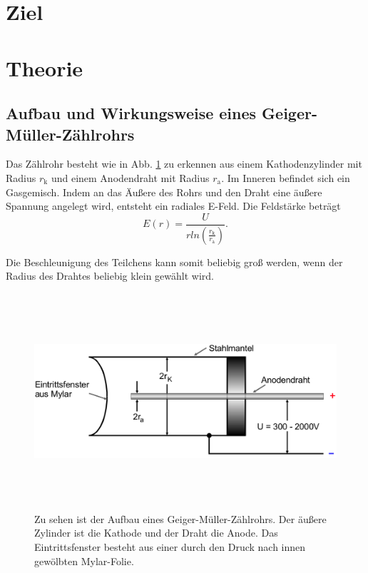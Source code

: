 \section{Ziel}

\section{Theorie}
\label{sec:Theorie}

\subsection{Aufbau und Wirkungsweise eines Geiger-Müller-Zählrohrs}

Das Zählrohr besteht wie in Abb. \ref{fig:zaehlrohr} zu erkennen aus einem Kathodenzylinder mit Radius $r_\text{k}$ und einem Anodendraht mit Radius $r_\text{a}$. Im Inneren befindet sich ein Gasgemisch. Indem an das Äußere des Rohrs und den Draht eine äußere Spannung angelegt wird, entsteht ein radiales E-Feld. Die Feldstärke beträgt 
\begin{equation*}
    E(r) = \frac{U}{r ln(\frac{r_\text{k}}{r_\text{a}})}.
    \label{eqn:feldstärke}
\end{equation*}

Die Beschleunigung des Teilchens kann somit beliebig groß werden, wenn der Radius des Drahtes beliebig klein gewählt wird. %

\begin{figure}
    \centering
    \includegraphics[width=12cm, height=8cm]{build/zaehlrohr.png}
    \caption{Zu sehen ist der Aufbau eines Geiger-Müller-Zählrohrs. Der äußere Zylinder ist die Kathode und der Draht die Anode. Das Eintrittsfenster besteht aus einer durch den Druck nach innen gewölbten Mylar-Folie. \cite{V703}}
    \label{fig:zaehlrohr}
\end{figure}

